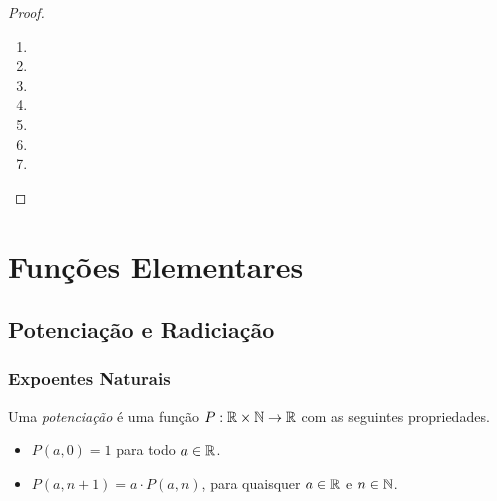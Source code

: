 \begin{proof}
    \leavevmode
        \begin{enumerate}[leftmargin=*, align=left, label=\textbf{(\alph*)}]
            \item \blackproof
            \item \blackproof
            \item \blackproof
            \item \blackproof
            \item \blackproof
            \item \blackproof
            \item \blackproof
        \end{enumerate}
\end{proof}

\section{Funções Elementares}

\subsection{Potenciação e Radiciação}

\subsubsection{Expoentes Naturais}

\begin{definition}
    Uma \emph{potenciação} é uma função $P : \mathbb{R} \times \mathbb{N} \to \mathbb{R}$ com as seguintes propriedades.
        \begin{itemize}
            \item $P(a,0) = 1$ para todo $a \in \mathbb{R}$.
            \item $P(a,n+1) = a \cdot P(a,n)$, para quaisquer $a \in \mathbb{R}$ e $n \in \mathbb{N}$.
        \end{itemize}
\end{definition}


